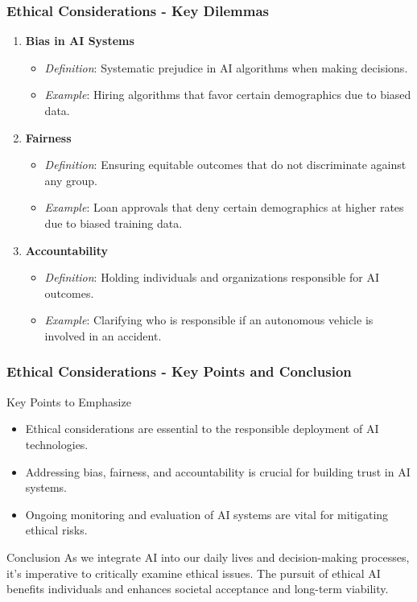 \documentclass[aspectratio=169]{beamer}
\begin{document}
\begin{frame}[fragile]
    \frametitle{Ethical Considerations - Key Dilemmas}
    \begin{enumerate}
        \item \textbf{Bias in AI Systems}
          \begin{itemize}
              \item \textit{Definition}: Systematic prejudice in AI algorithms when making decisions.
              \item \textit{Example}: Hiring algorithms that favor certain demographics due to biased data.
          \end{itemize}
        
        \item \textbf{Fairness}
          \begin{itemize}
              \item \textit{Definition}: Ensuring equitable outcomes that do not discriminate against any group.
              \item \textit{Example}: Loan approvals that deny certain demographics at higher rates due to biased training data.
          \end{itemize}
        
        \item \textbf{Accountability}
          \begin{itemize}
              \item \textit{Definition}: Holding individuals and organizations responsible for AI outcomes.
              \item \textit{Example}: Clarifying who is responsible if an autonomous vehicle is involved in an accident.
          \end{itemize}
    \end{enumerate}
\end{frame}

\begin{frame}[fragile]
    \frametitle{Ethical Considerations - Key Points and Conclusion}
    \begin{block}{Key Points to Emphasize}
        \begin{itemize}
            \item Ethical considerations are essential to the responsible deployment of AI technologies.
            \item Addressing bias, fairness, and accountability is crucial for building trust in AI systems.
            \item Ongoing monitoring and evaluation of AI systems are vital for mitigating ethical risks.
        \end{itemize}
    \end{block}
    
    \begin{block}{Conclusion}
        As we integrate AI into our daily lives and decision-making processes, it’s imperative to critically examine ethical issues. The pursuit of ethical AI benefits individuals and enhances societal acceptance and long-term viability.
    \end{block}
\end{frame}
\end{document}
